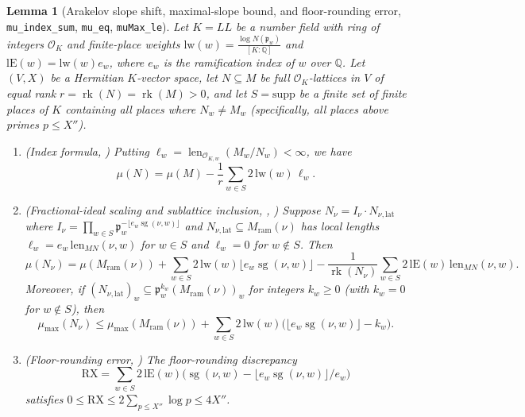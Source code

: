 \documentclass[11pt]{amsart}
\newcommand{\Q}{\mathbb{Q}}
\newcommand{\Oc}{\mathcal{O}}
\newcommand{\fp}{\mathfrak{p}}
\DeclareMathOperator{\rk}{rk}
\theoremstyle{plain}
\newtheorem{lemma}[theorem]{Lemma}
\theoremstyle{definition}
\numberwithin{equation}{section}
\begin{document}
\begin{lemma}[Arakelov slope shift, maximal-slope bound, and floor-rounding error, \texttt{mu\_index\_sum}, \texttt{mu\_eq}, \texttt{muMax\_le}]\label{lem:muindex}
Let $K=LL$ be a number field with ring of integers $\Oc_K$ and finite-place weights
$\mathrm{lw}(w)=\frac{\log N(\fp_w)}{[K:\Q]}$ and $\mathrm{lE}(w)=\mathrm{lw}(w)e_w$, where $e_w$
is the ramification index of $w$ over $\Q$. Let $(V,X)$ be a Hermitian $K$-vector space, let
$N\subseteq M$ be full $\Oc_K$-lattices in $V$ of equal rank $r=\rk(N)=\rk(M)>0$, and let
$S=\mathrm{supp}$ be a finite set of finite places of $K$ containing all places where
$N_w\neq M_w$ (specifically, all places above primes $p\le X''$).
\begin{enumerate}[label=(\roman*)]
\item \textup{(Index formula, )} Putting
  $\ell_w=\operatorname{len}_{\Oc_{K,w}}(M_w/N_w)<\infty$, we have
  \[
  \mu(N)=\mu(M)-\frac{1}{r}\sum_{w\in S}2\,\mathrm{lw}(w)\,\ell_w.
  \]
\item \textup{(Fractional-ideal scaling and sublattice inclusion, , )}
  Suppose $N_\nu=I_\nu\cdot N_{\nu,\mathrm{lat}}$ where
  $I_\nu=\prod_{w\in S}\fp_w^{-\lfloor e_w\operatorname{sg}(\nu,w)\rfloor}$ and
  $N_{\nu,\mathrm{lat}}\subseteq M_{\mathrm{ram}}(\nu)$ has local lengths
  $\ell_w=e_w\,\mathrm{len}_{MN}(\nu,w)$ for $w\in S$ and $\ell_w=0$ for $w\notin S$. Then
  \begin{equation}\label{eq:mueq}
  \mu(N_\nu)=\mu(M_{\mathrm{ram}}(\nu))+\sum_{w\in S}2\,\mathrm{lw}(w)\lfloor e_w\operatorname{sg}(\nu,w)\rfloor
  -\frac{1}{\rk(N_\nu)}\sum_{w\in S}2\,\mathrm{lE}(w)\,\mathrm{len}_{MN}(\nu,w).
  \end{equation}
  Moreover, if $(N_{\nu,\mathrm{lat}})_w\subseteq\fp_w^{k_w}(M_{\mathrm{ram}}(\nu))_w$ for
  integers $k_w\ge 0$ (with $k_w=0$ for $w\notin S$), then
  \begin{equation}\label{eq:muMaxle}
  \mu_{\max}(N_\nu)\le\mu_{\max}(M_{\mathrm{ram}}(\nu))
  +\sum_{w\in S}2\,\mathrm{lw}(w)\bigl(\lfloor e_w\operatorname{sg}(\nu,w)\rfloor-k_w\bigr).
  \end{equation}
\item \textup{(Floor-rounding error, )} The floor-rounding discrepancy
  \[
  \mathrm{RX}=\sum_{w\in S}2\,\mathrm{lE}(w)\bigl(\operatorname{sg}(\nu,w)-\lfloor e_w\operatorname{sg}(\nu,w)\rfloor/e_w\bigr)
  \]
  satisfies $0\le\mathrm{RX}\le 2\sum_{p\le X''}\log p\le 4 X''$.
\end{enumerate}
\end{lemma}
\end{document}
